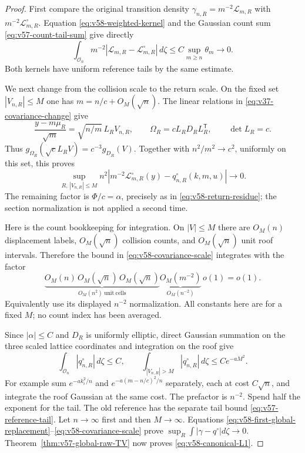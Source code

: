\begin{proof}
First compare the original transition density
$\gamma_{n,R}=m^{-2}\mathcal L_{m,R}$ with
$m^{-2}\mathcal L^\circ_{m,R}$. Equation
\eqref{eq:v58-weighted-kernel} and the Gaussian count sum
\eqref{eq:v57-count-tail-sum} give directly
\begin{equation}\label{eq:v58-first-global-replacement}
 \int_{\mathcal O_n}m^{-2}|\mathcal L_{m,R}-\mathcal L^\circ_{m,R}|
                    \,d\zeta\le C\sup_{m\ge n}\theta_m\to0.
\end{equation}
Both kernels have uniform reference tails by the same estimate.

We next change from the collision scale to the return scale. On the
fixed set $|V_{n,R}|\le M$ one has $m=n/c+O_M(\sqrt n)$.
The linear relations in \eqref{eq:v37-covariance-change} give
\[
 \frac{y-m\mu_R}{\sqrt m}=\sqrt{n/m}\,L_RV_{n,R},\qquad
 \Omega_R=cL_RD_RL_R^{\mathsf T},\qquad \det L_R=c.
\]
Thus
$g_{\Omega_R}(\sqrt cL_RV)=c^{-3}g_{D_R}(V)$.
Together with $n^2/m^2\to c^2$, uniformly on this set, this proves
\begin{equation}\label{eq:v58-covariance-scale}
 \sup_{R,\,|V_{n,R}|\le M}
 n^2|m^{-2}\mathcal L^\circ_{m,R}(y)-q^\circ_{n,R}(k,m,u)|\to0.
\end{equation}
The remaining factor is $\Phi/c=\alpha$, precisely as in
\eqref{eq:v58-return-residue}; the section normalization is not
applied a second time.

Here is the count bookkeeping for integration. On $|V|\le M$ there
are $O_M(n)$ displacement labels, $O_M(\sqrt n)$ collision counts,
and $O_M(\sqrt n)$ unit roof intervals. Therefore the bound in
\eqref{eq:v58-covariance-scale} integrates with the factor
\begin{equation}\label{eq:v58-cell-bookkeeping}
 \underbrace{O_M(n)\,O_M(\sqrt n)\,O_M(\sqrt n)}_{O_M(n^2)
                       \ \mathrm{unit\ cells}}
       \underbrace{O_M(m^{-2})}_{O_M(n^{-2})}\,o(1)=o(1).
\end{equation}
Equivalently use its displayed $n^{-2}$ normalization. All constants
here are for a fixed $M$; no count index has been averaged.

Since $|\alpha|\le C$ and $D_R$ is uniformly elliptic, direct
Gaussian summation on the three scaled lattice coordinates and
integration on the roof give
\[
 \int_{\mathcal O_n}|q^\circ_{n,R}|\,d\zeta\le C,\qquad
 \int_{|V_{n,R}|>M}|q^\circ_{n,R}|\,d\zeta\le Ce^{-aM^2}.
\]
For example sum $e^{-a k_i^2/n}$ and
$e^{-a(m-n/c)^2/n}$ separately, each at cost $C\sqrt n$, and
integrate the roof Gaussian at the same cost. The prefactor is
$n^{-2}$. Spend half the exponent for the tail. The old reference
has the separate tail bound \eqref{eq:v57-reference-tail}.
Let $n\to\infty$ first and then $M\to\infty$. Equations
\eqref{eq:v58-first-global-replacement}--\eqref{eq:v58-covariance-scale}
prove $\sup_R\int|\gamma-q^\circ|d\zeta\to0$.
Theorem~\ref{thm:v57-global-raw-TV} now proves
\eqref{eq:v58-canonical-L1}.


\end{proof}

